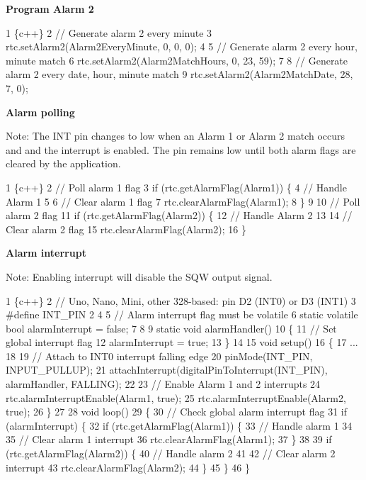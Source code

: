 {\bfseries Program Alarm 2}


\begin{DoxyCode}
1 \{c++\}
2 // Generate alarm 2 every minute
3 rtc.setAlarm2(Alarm2EveryMinute, 0, 0, 0);
4 
5 // Generate alarm 2 every hour, minute match
6 rtc.setAlarm2(Alarm2MatchHours, 0, 23, 59);
7 
8 // Generate alarm 2 every date, hour, minute match
9 rtc.setAlarm2(Alarm2MatchDate, 28, 7, 0);
\end{DoxyCode}


{\bfseries Alarm polling}

Note\+: The {\ttfamily I\+NT} pin changes to low when an Alarm 1 or Alarm 2 match occurs and and the interrupt is enabled. The pin remains low until both alarm flags are cleared by the application.


\begin{DoxyCode}
1 \{c++\}
2 // Poll alarm 1 flag
3 if (rtc.getAlarmFlag(Alarm1)) \{
4     // Handle Alarm 1
5 
6     // Clear alarm 1 flag
7     rtc.clearAlarmFlag(Alarm1);
8 \}
9 
10 // Poll alarm 2 flag
11 if (rtc.getAlarmFlag(Alarm2)) \{
12     // Handle Alarm 2
13 
14     // Clear alarm 2 flag
15     rtc.clearAlarmFlag(Alarm2);
16 \}
\end{DoxyCode}


{\bfseries Alarm interrupt}

Note\+: Enabling interrupt will disable the {\ttfamily S\+QW} output signal.


\begin{DoxyCode}
1 \{c++\}
2 // Uno, Nano, Mini, other 328-based: pin D2 (INT0) or D3 (INT1)
3 #define INT\_PIN     2
4 
5 // Alarm interrupt flag must be volatile
6 static volatile bool alarmInterrupt = false;
7 
8 
9 static void alarmHandler()
10 \{
11     // Set global interrupt flag
12     alarmInterrupt = true;
13 \}
14 
15 void setup()
16 \{
17     ...
18 
19     // Attach to INT0 interrupt falling edge
20     pinMode(INT\_PIN, INPUT\_PULLUP);
21     attachInterrupt(digitalPinToInterrupt(INT\_PIN), alarmHandler, FALLING);
22 
23     // Enable Alarm 1 and 2 interrupts
24     rtc.alarmInterruptEnable(Alarm1, true);
25     rtc.alarmInterruptEnable(Alarm2, true);
26 \}
27 
28 void loop()
29 \{
30     // Check global alarm interrupt flag
31     if (alarmInterrupt) \{
32         if (rtc.getAlarmFlag(Alarm1)) \{
33             // Handle alarm 1
34 
35             // Clear alarm 1 interrupt
36             rtc.clearAlarmFlag(Alarm1);
37         \}
38 
39         if (rtc.getAlarmFlag(Alarm2)) \{
40             // Handle alarm 2
41 
42             // Clear alarm 2 interrupt
43             rtc.clearAlarmFlag(Alarm2);
44         \}
45     \}
46 \}
\end{DoxyCode}


